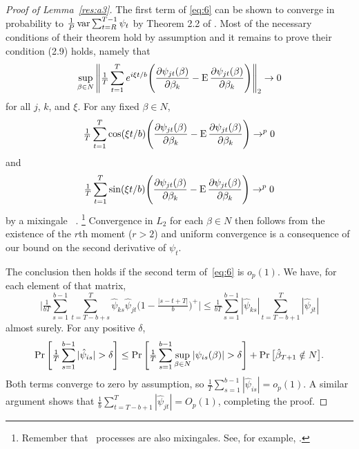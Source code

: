 \documentclass[12pt,fleqn]{article}
\begin{document}
\begin{proof}[Proof of Lemma~\ref{res:a3}]
  The first term of \eqref{eq:6} can be shown to converge in
  probability to $\tfrac{1}{P} \operatorname{var} \sum_{t=R}^{T-1} \psi_t$ by Theorem 2.2 of
  \citet{JoD:00}.  Most of the necessary conditions of their theorem
  hold by assumption and it remains to prove their condition (2.9)
  holds, namely that
  \begin{equation}\label{eq:2}
    \sup_{\beta \in N} \Bigg\lVert \tfrac{1}{T} \sum_{t=1}^T e^{i \xi t/b}
    \Bigg( \frac{\partial \psi_{jt}(\beta)}{\partial \beta_k} -
          \operatorname{E} \frac{\partial \psi_{jt}(\beta)}{\partial \beta_k} \Bigg)
    \Bigg\rVert_2 \to 0
  \end{equation}
  for all $j$, $k$, and $\xi$.  For any fixed $\beta \in N$,
  \begin{equation*}
    \tfrac{1}{T} \sum_{t=1}^T \cos( \xi t / b )
    \Bigg( \frac{\partial \psi_{jt}(\beta)}{\partial \beta_k} -
          \operatorname{E} \frac{\partial \psi_{jt}(\beta)}{\partial \beta_k} \Bigg)
    \to^p 0
  \end{equation*}
  and
  \begin{equation*}
    \tfrac{1}{T} \sum_{t=1}^T \sin( \xi t / b )
    \Bigg( \frac{\partial \psi_{jt}(\beta)}{\partial \beta_k} -
          \operatorname{E} \frac{\partial \psi_{jt}(\beta)}{\partial \beta_k} \Bigg)
    \to^p 0
  \end{equation*}
  by a mixingale \lln\ \citep{Dav:93}.%
\footnote{Remember that \ned\
    processes are also mixingales.  See, for example, \citet[Section
    17.2]{Dav:94}.} %
  Convergence in $L_2$ for each $\beta \in N$ then
  follows from the existence of the $r$th moment ($r > 2$) and uniform
  convergence is a consequence of our bound on the second derivative
  of $\psi_t$.

  The conclusion then holds if the second term of~\eqref{eq:6} is
  $o_p(1)$.  We have, for each element of that matrix,
  \begin{equation*}
    \Big| \tfrac{1}{bT} \sum_{s = 1}^{b - 1} \sum_{t = T - b + s}^{T}
        \hat\psi_{ks} \hat\psi_{jt}
        \big(1 - \tfrac{\lvert s - t + T\rvert}{b}\big)^+ \Big| \leq
     \tfrac{1}{b T} \sum_{s = 1}^{b - 1} |\hat\psi_{ks}|
         \sum_{t = T - b + 1}^{T} | \hat\psi_{jt} |
  \end{equation*}
  almost surely.  For any positive $\delta$,
  \begin{equation*}
    \operatorname{Pr} \Bigg[ \tfrac{1}{T} \sum_{s = 1}^{b - 1} | \hat\psi_{is} |
              > \delta \Bigg] \leq
    \operatorname{Pr} \Bigg[\tfrac{1}{T} \sum_{s = 1}^{b - 1} \sup_{ \beta \in N } | \psi_{is}( \beta ) |
              > \delta \Bigg] +
    \operatorname{Pr} \big[ \hat \beta_{T+1} \notin N \big].
  \end{equation*}
  Both terms converge to zero by assumption, so $\tfrac{1}{T} \sum_{s
    = 1}^{b - 1} |\hat\psi_{is}| = o_p(1)$.  A similar
  argument shows that $\tfrac{1}{b} \sum_{t = T - b + 1}^{T} |
  \hat\psi_{jt} | = O_p(1)$, completing the proof.
\end{proof}
\end{document}
